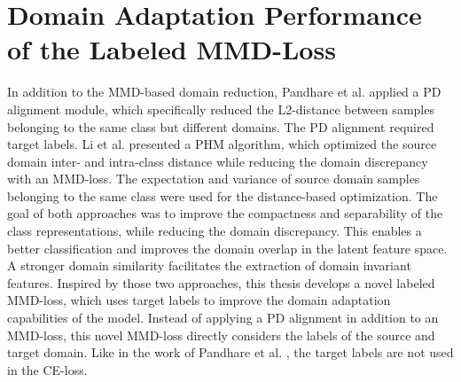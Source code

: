 \section{Domain Adaptation Performance of the Labeled MMD-Loss}
In addition to the MMD-based domain reduction, Pandhare et al. \cite{Pandhare2021} applied a PD alignment module, which specifically reduced the L2-distance between samples belonging to the same class but different domains. The PD alignment required target labels. Li et al. \cite{Li2018} presented a PHM algorithm, which optimized the source domain inter- and intra-class distance while reducing the domain discrepancy with an MMD-loss. The expectation and variance of source domain samples belonging to the same class were used for the distance-based optimization. The goal of both approaches was to improve the compactness and separability of the class representations, while reducing the domain discrepancy. This enables a better classification and improves the domain overlap in the latent feature space. A stronger domain similarity facilitates the extraction of domain invariant features. Inspired by those two approaches, this thesis develops a novel labeled MMD-loss, which uses target labels to improve the domain adaptation capabilities of the model. Instead of applying a PD alignment in addition to an MMD-loss, this novel MMD-loss directly considers the labels of the source and target domain. Like in the work of Pandhare et al. \cite{Pandhare2021}, the target labels are not used in the CE-loss.


